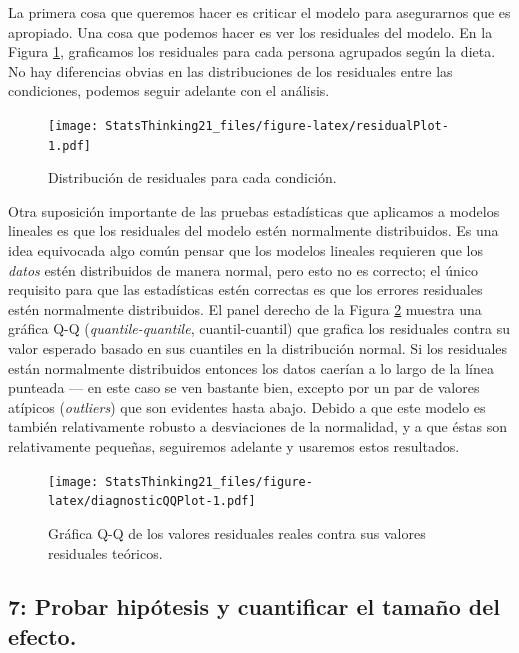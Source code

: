\documentclass[
  12pt,
]{book}
\begin{document}
La primera cosa que queremos hacer es criticar el modelo para asegurarnos que es apropiado. Una cosa que podemos hacer es ver los residuales del modelo. En la Figura \ref{fig:residualPlot}, graficamos los residuales para cada persona agrupados según la dieta. No hay diferencias obvias en las distribuciones de los residuales entre las condiciones, podemos seguir adelante con el análisis.

\begin{figure}
\centering
\texttt{[image: StatsThinking21\_files/figure-latex/residualPlot-1.pdf]}
\caption{\label{fig:residualPlot}Distribución de residuales para cada condición.}
\end{figure}

Otra suposición importante de las pruebas estadísticas que aplicamos a modelos lineales es que los residuales del modelo estén normalmente distribuidos. Es una idea equivocada algo común pensar que los modelos lineales requieren que los \emph{datos} estén distribuidos de manera normal, pero esto no es correcto; el único requisito para que las estadísticas estén correctas es que los errores residuales estén normalmente distribuidos. El panel derecho de la Figura \ref{fig:diagnosticQQPlot} muestra una gráfica Q-Q (\emph{quantile-quantile}, cuantil-cuantil) que grafica los residuales contra su valor esperado basado en sus cuantiles en la distribución normal. Si los residuales están normalmente distribuidos entonces los datos caerían a lo largo de la línea punteada --- en este caso se ven bastante bien, excepto por un par de valores atípicos (\emph{outliers}) que son evidentes hasta abajo. Debido a que este modelo es también relativamente robusto a desviaciones de la normalidad, y a que éstas son relativamente pequeñas, seguiremos adelante y usaremos estos resultados.

\begin{figure}
\centering
\texttt{[image: StatsThinking21\_files/figure-latex/diagnosticQQPlot-1.pdf]}
\caption{\label{fig:diagnosticQQPlot}Gráfica Q-Q de los valores residuales reales contra sus valores residuales teóricos.}
\end{figure}

\hypertarget{probar-hipuxf3tesis-y-cuantificar-el-tamauxf1o-del-efecto.}{%
\subsection{7: Probar hipótesis y cuantificar el tamaño del efecto.}\label{probar-hipuxf3tesis-y-cuantificar-el-tamauxf1o-del-efecto.}}
\end{document}
